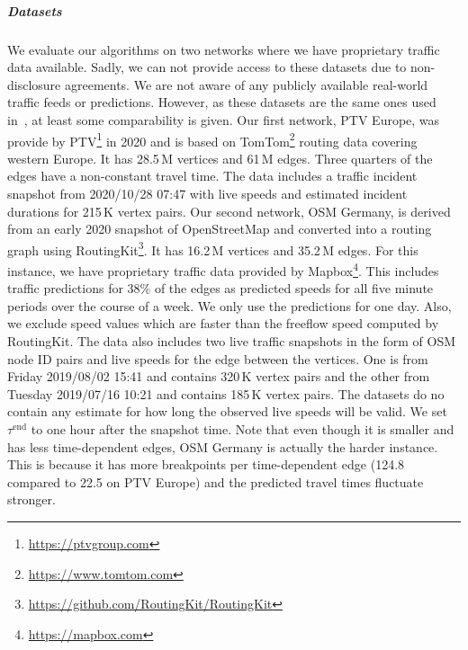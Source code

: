 \documentclass[a4paper,UKenglish,cleveref, autoref, thm-restate,anonymous]{lipics-v2021}
\begin{document}
\subparagraph{Datasets}
We evaluate our algorithms on two networks where we have proprietary traffic data available.
Sadly, we can not provide access to these datasets due to non-disclosure agreements.
We are not aware of any publicly available real-world traffic feeds or predictions.
However, as these datasets are the same ones used in~\cite{swz-sfert-21,strasser_et_al:LIPIcs.SEA.2021.6}, at least some comparability is given.
%
Our first network, PTV Europe, was provide by PTV\footnote{\url{https://ptvgroup.com}} in 2020 and is based on TomTom\footnote{\url{https://www.tomtom.com}} routing data covering western Europe.
It has 28.5\,M vertices and 61\,M edges.
Three quarters of the edges have a non-constant travel time.
The data includes a traffic incident snapshot from 2020/10/28 07:47 with live speeds and estimated incident durations for 215\,K vertex pairs.
%
Our second network, OSM Germany, is derived from an early 2020 snapshot of OpenStreetMap and converted into a routing graph using RoutingKit\footnote{\url{https://github.com/RoutingKit/RoutingKit}}.
It has 16.2\,M vertices and 35.2\,M edges.
For this instance, we have proprietary traffic data provided by Mapbox\footnote{\url{https://mapbox.com}}.
This includes traffic predictions for 38\% of the edges as predicted speeds for all five minute periods over the course of a week.
We only use the predictions for one day.
Also, we exclude speed values which are faster than the freeflow speed computed by RoutingKit.
The data also includes two live traffic snapshots in the form of OSM node ID pairs and live speeds for the edge between the vertices.
One is from Friday 2019/08/02 15:41 and contains 320\,K vertex pairs and the other from Tuesday 2019/07/16 10:21 and contains 185\,K vertex pairs.
The datasets do no contain any estimate for how long the observed live speeds will be valid.
We set $\tau^{\operatorname{end}}$ to one hour after the snapshot time.
Note that even though it is smaller and has less time-dependent edges, OSM Germany is actually the harder instance.
This is because it has more breakpoints per time-dependent edge (124.8 compared to 22.5 on PTV Europe) and the predicted travel times fluctuate stronger.
\end{document}

